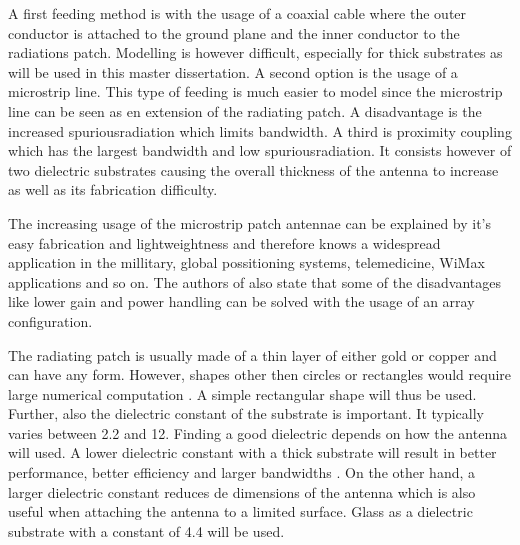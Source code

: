 A first feeding method is with the usage of a coaxial cable where the outer conductor is attached to the ground plane and the inner conductor to the radiations patch. Modelling is however difficult, especially for thick substrates as will be used in this master dissertation.
A second option is the usage of a microstrip line. This type of feeding is much easier to model since the microstrip line can be seen as en extension of the radiating patch.
A disadvantage is the increased \gls{spuriousradiation} which limits bandwidth.
A third is proximity coupling which has the largest bandwidth and low \gls{spuriousradiation}. It consists however of two dielectric substrates causing the overall thickness
of the antenna to increase as well as its fabrication difficulty.

The increasing usage of the microstrip patch antennae can be explained by it's easy fabrication and lightweightness and therefore knows a widespread application in the millitary, global possitioning systems, telemedicine, WiMax applications and so on.
The authors of \cite{J13_microstripadvantages} also state that some of the disadvantages like lower gain and power handling can be solved with the usage of an array configuration.

The radiating patch is usually made of a thin layer of either gold or copper \cite{J14_antennadesign,J15_antennadesign}
and can have any form. However, shapes other then circles or rectangles would require large numerical computation \cite{J14_antennadesign}.
A simple rectangular shape will thus be used.
Further, also the dielectric constant of the substrate is important. It typically varies between 2.2 and 12.
Finding a good dielectric depends on how the antenna will used. A lower
dielectric constant with a thick substrate will result in better performance, better efficiency and larger bandwidths  \cite{J15_antennadesign}.
On the other hand, a larger dielectric constant reduces de dimensions of the antenna \cite{J14_antennadesign}
which is also useful when attaching the 
antenna to a limited surface. Glass as a dielectric substrate with a constant of 4.4 will be used.
